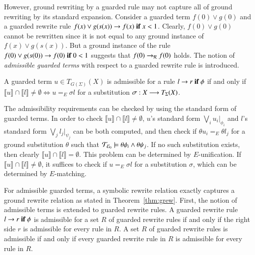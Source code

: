 However, ground rewriting by a guarded rule may not capture all of
ground rewriting by its standard expansion.
%
Consider a guarded term $f(0) \vee g(0)$ and a guarded rewrite rule
$f(x) \vee g(s(x)) \rightarrow f(x)\;\textnormal{\bf if}\; {x < 1}$.  Clearly, $f(0) \vee g(0)$
cannot be rewritten since it is not equal to any ground instance of
$f(x) \vee g(s(x))$.  But a ground instance of the rule $f(0)
  \vee g(s(0)) \rightarrow f(0)\;\textnormal{\bf if}\; {0 < 1}$ suggests that $f(0) \to_{\mathcal{R}} f(0)$ holds.
The notion of \emph{admissible guarded terms} with respect to a
guarded rewrite rule is introduced.

\begin{definition}
A guarded term $u \in T_{G(\Sigma)}(X)$ is admissible for a rule
$l \rightarrow r\;\textnormal{\bf if}\; {\phi}$ if and only if $\llbracket u \rrbracket \cap
\llbracket l \rrbracket \neq \emptyset \iff u =_E \sigma l$ for a
substitution $\sigma : X \longrightarrow T_\Sigma(X)$.
\end{definition}

The admissibility requirements can be checked by using the standard
form of guarded terms.  In order to check $\llbracket u \rrbracket
\cap \llbracket l \rrbracket \neq \emptyset$, $u$'s standard form
$\bigvee_i u_i |_{\phi_i}$ and $l$'s standard form $\bigvee_j l_j
|_{\psi_j}$ can be both computed, and then check if $\theta u_i =_E
\theta l_j$ for a ground substitution $\theta$ such that $\mathcal{T}_{\mathcal{E}_{0}}
\models \theta \phi_i \wedge \theta \psi_j$.  If no such substitution
exists, then clearly $\llbracket u \rrbracket \cap \llbracket l
\rrbracket = \emptyset$.  This problem can be determined by
$E$-unification.  If $\llbracket u \rrbracket \cap \llbracket l
\rrbracket \neq \emptyset$, it suffices to check if $u =_E \sigma l$
for a substitution $\sigma$, which can be determined by $E$-matching.

For admissible guarded terms, a symbolic rewrite relation exactly
captures a ground rewrite relation as stated in
Theorem~\ref{thm:grew}.  First, the notion of admissible terms is
extended to guarded rewrite rules.  A guarded rewrite rule
$l \rightarrow r\;\textnormal{\bf if}\; {\phi}$ is admissible for a set $R$ of guarded rewrite
rules if and only if the right side $r$ is admissible for every rule
in $R$.  A set $R$ of guarded rewrite rules is admissible if and only
if every guarded rewrite rule in $R$ is admissible for every rule in
$R$.



